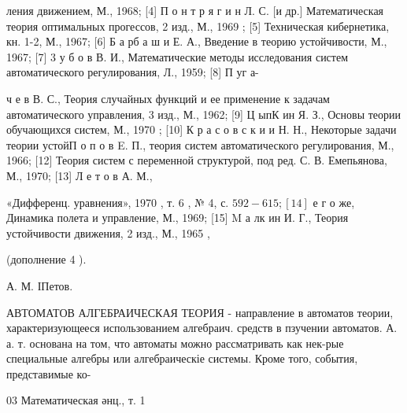 \documentclass[10pt]{article}
\begin{document}
ления движением, М., 1968; [4] П о н т р я г и н Л. С. [и др.] Математическая теория оптимальных прогессов, 2 изд., М., 1969 ; [5] Техническая кибернетика, кн. 1-2, М., 1967; [6] Б а рб а ш и Е. А., Введение в теорию устойчивости, М., 1967; [7] 3 у б о в В. И., Математические методы исследования систем автоматического регулирования, Л., 1959; [8] П уг а-

ч е в В. С., Теория случайных функций и ее применение к задачам автоматического управления, 3 изд., М., 1962; [9] Ц ыпК ин Я. З., Основы теории обучающихся систем, М., 1970 ; [10] К р а с о в с к и и Н. Н., Некоторые задачи теории устойП о п о в E. П., теория систем автоматического регулирования, М., 1966; [12] Теория систем с переменной структурой, под ред. С. В. Емепьянова, М., 1970; [13] Л е т о в А. М.,

«Дифференц. уравнения», 1970 , т. 6 , № 4, с. $592-615 ;[14]$ е г о же, Динамика полета и управление, М., 1969; [15] M а лк ин И. Г., Теория устойчивости движения, 2 изд., М., 1965 ,

(дополнение 4 ).

А. М. ІПетов.



АВТОМАТОВ АЛГЕБРАИЧЕСКАЯ ТЕОРИЯ - направление в автоматов теории, характеризующееся использованием алгебраич. средств в пзучении автоматов. А. а. т. основана на том, что автоматы можно рассматривать как нек-рые специальные алгебры или алгебраическіе системы. Кроме того, события, представимые ко-



03 Математическая әнц., т. 1
\end{document}
